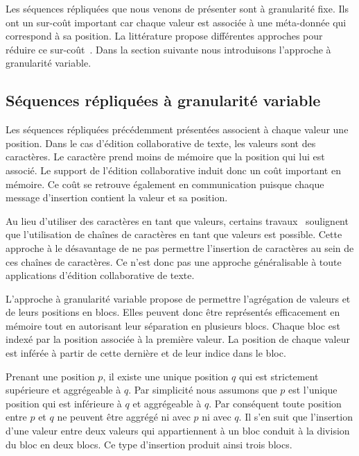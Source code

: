 Les séquences répliquées que nous venons de présenter sont à granularité fixe.
Ils ont un sur-coût important car chaque valeur est associée à une méta-donnée qui correspond à sa position.
La littérature propose différentes approches pour réduire ce sur-coût~\autocite{ andre_2013_logootsplit, briot_2016_rgasplit,nedelec_2013_lseq,nicolas2020_renaming}.
Dans la section suivante nous introduisons l'approche à granularité variable.


\subsection{Séquences répliquées à granularité variable}\label{subsec:strwise-seq}

Les séquences répliquées précédemment présentées associent à chaque valeur une position.
Dans le cas d'édition collaborative de texte, les valeurs sont des caractères.
Le caractère prend moins de mémoire que la position qui lui est associé.
Le support de l'édition collaborative induit donc un coût important en mémoire.
Ce coût se retrouve également en communication puisque chaque message d'insertion contient la valeur et sa position.

Au lieu d'utiliser des caractères en tant que valeurs, certains travaux~\autocite{oster_2006_woot} soulignent que l'utilisation de chaînes de caractères en tant que valeurs est possible.
Cette approche à le désavantage de ne pas permettre l'insertion de caractères au sein de ces chaînes de caractères.
Ce n'est donc pas une approche généralisable à toute applications d'édition collaborative de texte.

L'approche à granularité variable propose de permettre l'agrégation de valeurs et de leurs positions en blocs.
Elles peuvent donc être représentés efficacement en mémoire tout en autorisant leur séparation en plusieurs blocs.
Chaque bloc est indexé par la position associée à la première valeur.
La position de chaque valeur est inférée à partir de cette dernière et de leur indice dans le bloc.

Prenant une position $p$, il existe une unique position $q$ qui est strictement supérieure et aggrégeable à $q$.
Par simplicité nous assumons que $p$ est l'unique position qui est inférieure à $q$ et aggrégeable à $q$.
Par conséquent toute position entre $p$ et $q$ ne peuvent être aggrégé ni avec $p$ ni avec $q$.
Il s'en suit que l'insertion d'une valeur entre deux valeurs qui appartiennent à un bloc conduit à la division du bloc en deux blocs.
Ce type d'insertion produit ainsi trois blocs.

